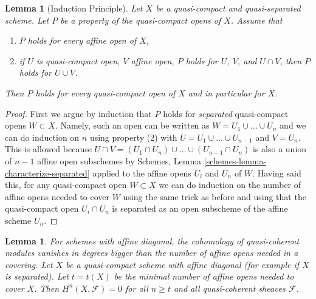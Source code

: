\documentclass{stacks-project}
\newenvironment{reference}{\comment}{\endcomment}
\newenvironment{slogan}{\comment}{\endcomment}
\theoremstyle{plain}
\newtheorem{lemma}[subsection]{Lemma}
\theoremstyle{definition}
\theoremstyle{remark}
\numberwithin{equation}{subsection}
\begin{document}
\begin{lemma}[Induction Principle]
\label{lemma-induction-principle}
\begin{reference}
\cite[Proposition 3.3.1]{BvdB}
\end{reference}
Let $X$ be a quasi-compact and quasi-separated scheme. Let $P$ be a property
of the quasi-compact opens of $X$. Assume that
\begin{enumerate}
\item $P$ holds for every affine open of $X$,
\item if $U$ is quasi-compact open, $V$ affine open,
$P$ holds for $U$, $V$, and $U \cap V$, then
$P$ holds for $U \cup V$.
\end{enumerate}
Then $P$ holds for every quasi-compact open of $X$
and in particular for $X$.
\end{lemma}

\begin{proof}
First we argue by induction that $P$ holds for {\it separated} quasi-compact
opens $W \subset X$. Namely, such an open can be written as
$W = U_1 \cup \ldots \cup U_n$ and we can do induction on $n$ using
property (2) with $U = U_1 \cup \ldots \cup U_{n - 1}$ and $V = U_n$.
This is allowed because
$U \cap V = (U_1 \cap U_n) \cup \ldots \cup (U_{n - 1} \cap U_n)$
is also a union of $n - 1$ affine open subschemes by
Schemes, Lemma \ref{schemes-lemma-characterize-separated}
applied to the affine opens $U_i$ and $U_n$ of $W$.
Having said this, for any quasi-compact open $W \subset X$ we can
do induction on the number of affine opens needed to cover $W$
using the same trick as before and using that the quasi-compact open
$U_i \cap U_n$ is separated as an open subscheme of the affine scheme $U_n$.
\end{proof}

\begin{lemma}
\label{lemma-vanishing-nr-affines}
\begin{slogan}
For schemes with affine diagonal, the cohomology of quasi-coherent
modules vanishes in degrees bigger than the number of affine
opens needed in a covering.
\end{slogan}
Let $X$ be a quasi-compact scheme with affine diagonal (for example
if $X$ is separated).
Let $t = t(X)$ be the minimal number of affine opens needed to
cover $X$. Then $H^n(X, \mathcal{F}) = 0$ for all $n \geq t$ and all
quasi-coherent sheaves $\mathcal{F}$.
\end{lemma}
\end{document}
